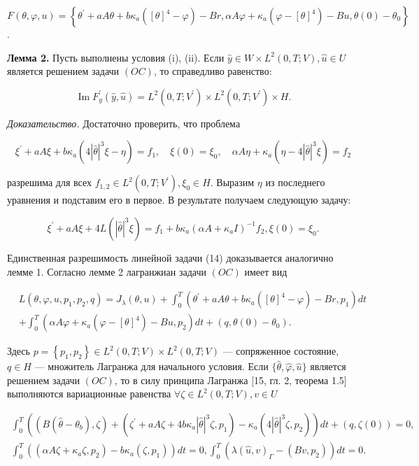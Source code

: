 $F(\theta, \varphi, u)=\left\{\theta^{\prime}+
a A \theta+b \kappa_{a}\left([\theta]^{4}-\varphi\right)-B r,
\alpha A \varphi+\kappa_{a}\left(\varphi-[\theta]^{4}\right)-B u, \theta(0)-\theta_{0}\right\}$.

\textbf{Лемма 2.}
Пусть выполнены условия (i), (ii).
Если $\widehat{y} \in W \times L^{2}(0, T ; V), \widehat{u} \in U$
является решением задачи $(OC)$, то справедливо равенство:

\[
\operatorname{Im} F_{y}^{\prime}
(\widehat{y}, \widehat{u})=L^{2}\left(0, T; V^{\prime}\right)
\times L^{2}\left(0, T; V^{\prime}\right) \times H.
\]

\textit{Доказательство.}
Достаточно проверить, что проблема

\[
\xi^{\prime}+a A \xi+b \kappa_{a}\left(4|\widehat{\theta}|^{3}
\xi-\eta\right)=f_{1}, \quad \xi(0)=\xi_{0},
\quad \alpha A \eta+\kappa_{a}\left(\eta-4|\widehat{\theta}|^{3} \xi\right)=f_{2}
\]

разрешима для всех $f_{1,2} \in L^{2}\left(0, T; V^{\prime}\right), \xi_{0} \in H$.
Выразим $\eta$ из последнего уравнения и подставим его в первое.
В результате получаем следующую задачу:


\[
\xi^{\prime}+a A \xi+4 L\left(|\widehat{\theta}|^{3}
\xi\right)=f_{1}+b \kappa_{a}\left(\alpha A+\kappa_{a}
I\right)^{-1} f_{2}, \xi(0)=\xi_{0}.
\]

Единственная разрешимость линейной задачи (14) доказывается аналогично лемме 1.
Согласно лемме 2 лагранжиан задачи $(OC)$ имеет вид

\[
\begin{aligned}
& L\left(\theta, \varphi, u, p_{1}, p_{2}, q\right)=J_{\lambda}(\theta, u)
+\int_{0}^{T}\left(\theta^{\prime} +a A \theta+b \kappa_{a}\left([\theta]^{4}-\varphi\right)
-B r, p_{1}\right) d t \\
&+\int_{0}^{T}\left(\alpha A \varphi+\kappa_{a}\left(\varphi-[\theta]^{4}\right)-B u,
p_{2}\right) d t+\left(q, \theta(0)-\theta_{0}\right).
\end{aligned}
\]

Здесь $p=\left\{p_{1}, p_{2}\right\} \in L^{2}(0, T; V) \times L^{2}(0, T; V) $ — сопряженное состояние,
$q \in H$ — множитель Лагранжа для начального условия.
Если $\{\widehat{\theta}, \widehat{\varphi}, \widehat{u}\}$ является решением задачи $(OC)$,
то в силу принципа Лагранжа [15, гл. 2, теорема 1.5]
выполняются вариационные равенства $\forall \zeta \in L^{2}(0, T ; V), v \in U$

\[
\begin{gathered}
\int_{0}^{T}\left(\left(B\left(\widehat{\theta}-\theta_{b}\right),
\zeta\right)+\left(\zeta^{\prime}
+a A \zeta+4 b \kappa_{a}|\widehat{\theta}|^{3} \zeta, p_{1}\right)
-\kappa_{a}\left(4|\widehat{\theta}|^{3} \zeta, p_{2}\right)\right) d t+(q, \zeta(0))=0, \\
\int_{0}^{T}\left(\left(\alpha A \zeta
+\kappa_{a} \zeta, p_{2}\right)-b \kappa_{a}\left(\zeta, p_{1}\right)\right) d t=0,
\int_{0}^{T}\left(\lambda(\widehat{u}, v)_{\Gamma}-\left(B v, p_{2}\right)\right) d t=0.
\end{gathered}
\]

